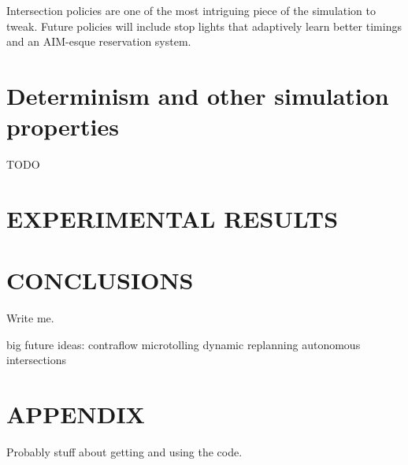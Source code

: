 \documentclass[letterpaper, 10 pt, conference]{ieeeconf}  %
\begin{document}

Intersection policies are one of the most intriguing piece of the simulation to
tweak. Future policies will include stop lights that adaptively learn better
timings and an AIM-esque reservation system.

\section{Determinism and other simulation properties}

TODO


\section{EXPERIMENTAL RESULTS}



\section{CONCLUSIONS}

Write me.

big future ideas:
  contraflow
  microtolling
  dynamic replanning
    autonomous intersections

\addtolength{\textheight}{-12cm}  %


\section*{APPENDIX}

Probably stuff about getting and using the code.
\end{document}
